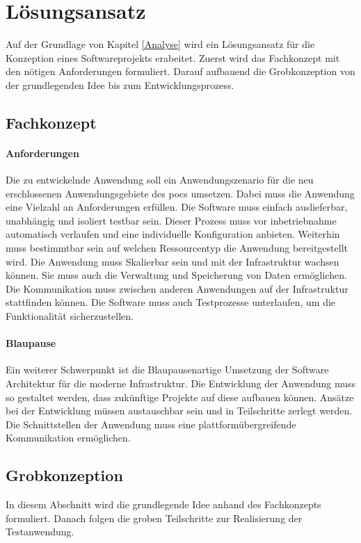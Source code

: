 \chapter{Lösungsansatz}
Auf der Grundlage von Kapitel \ref{Analyse} wird ein Lösungsansatz für die Konzeption eines Softwareprojekts erabeitet.
Zuerst wird das Fachkonzept mit den nötigen Anforderungen formuliert.
Darauf aufbauend die Grobkonzeption von der grundlegenden Idee bis zum Entwicklungsprozess.

\section{Fachkonzept}

\subsubsection{Anforderungen}
Die zu entwickelnde Anwendung soll ein Anwendungszenario für die neu erschlossenen Anwendungsgebiete des \ac{poc}s umsetzen.
Dabei muss die Anwendung eine Vielzahl an Anforderungen erfüllen.
Die Software muss einfach auslieferbar, unabhängig und isoliert testbar sein.
Dieser Prozess muss vor inbetriebnahme automatisch verlaufen und eine individuelle Konfiguration anbieten.
Weiterhin muss bestimmtbar sein auf welchen Ressourcentyp die Anwendung bereitgestellt wird.
Die Anwendung muss Skalierbar sein und mit der Infrastruktur wachsen können.
Sie muss auch die Verwaltung und Speicherung von Daten ermöglichen.
Die Kommunikation muss zwischen anderen Anwendungen auf der Infrastruktur stattfinden können.
Die Software muss auch Testprozesse unterlaufen, um die Funktionalität sicherzustellen.


\subsubsection{Blaupause}
Ein weiterer Schwerpunkt ist die Blaupausenartige Umsetzung der Software Architektur für die moderne Infrastruktur.
Die Entwicklung der Anwendung muss so gestaltet werden, dass zukünftige Projekte auf diese aufbauen können.
Ansätze bei der Entwicklung müssen austauschbar sein und in Teilschritte zerlegt werden.
Die Schnittstellen der Anwendung muss eine plattformübergreifende Kommunikation ermöglichen.


\section{Grobkonzeption}
In diesem Abschnitt wird die grundlegende Idee anhand des Fachkonzepts formuliert.
Danach folgen die groben Teilschritte zur Realisierung der Testanwendung.


